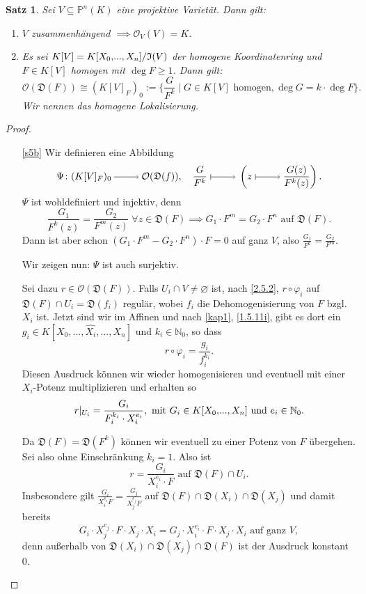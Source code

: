 \documentclass[a4paper,12pt]{scrbook}
\theoremstyle{keinenummern} %
\theoremstyle{mitnummern}
\newtheorem{satz}{Satz}
\theoremstyle{unserbeweis}
\newtheorem{proof}{Beweis}
\def\I{\mathfrak{I}}
\def\O{\mathcal{O}}
\def\P{\mathbb{P}}
\newcommand{\D}{\mathfrak{D}}
\newcommand{\leer}{\ensuremath{\varnothing}}
\newcommand{\restrict}[1]{|_{#1}}
\renewcommand{\dotsc}{\ensuremath{\!...}}
\newcommand{\set}[1]{\ensuremath{\mathbb{#1}}}
\newcommand{\N}{\set{N}}
\newcommand{\ra}{\raisebox{-1pt}{\tikz{\draw[thin,shorten >=3pt, ->] (0,0) node{\hspace*{-2pt}} -- node{} (1,0);}}\penalty1000\relax}
\renewcommand{\mapsto}{\raisebox{-1pt}{\tikz{\draw[thin,shorten >=3pt, |->] (0,0) node{\hspace*{0pt}} -- node{} (1,0);}}\penalty1000\relax}
\newcommand{\dach}{\widehat}
\newcommand{\Quotient}[2]{
  \mathchoice
  { %
    \raisebox{0.7ex}{\ensuremath{#1}}
    \ensuremath{\mkern-3mu}\big/\ensuremath{\mkern-3mu}
    \raisebox{-0.6ex}{\ensuremath{#2}}
  }
  { %
    #1/#2
  }
  { %
    #1/#2
  }
  { %
    #1/#2
  }
}
\newcommand{\ppolyx}[1][n]{\ensuremath%
  [X_{0},\dotsc,X_{#1}]}
\begin{document}
\begin{satz}\label{satz5}
Sei $V\subseteq\P^{n}(K)$ eine projektive Varietät. Dann gilt:
\begin{enumerate}
\item{} $V$ zusammenhängend $\implies\O_{V}(V)=K$.
\item{} Es sei $K[V]=\Quotient{K\ppolyx}{\I(V)}$ der homogene Koordinatenring und $F\in K[V]$ homogen mit $\deg F\geq 1$. Dann gilt:
\[\O(\D(F))\cong(K[V]_{F})_{0}:=\{\frac{G}{F^{k}}\mid G\in K[V]\text{ homogen}, \deg G = k\cdot\deg F\}.\]
Wir nennen das \emph{homogene Lokalisierung}.
\end{enumerate}\end{satz}
\begin{proof}\begin{enumerate}
\item[\ref{s5b}] Wir definieren eine Abbildung
\[\Psi\colon(K[V]_{F})_{0}\ra\O(\D(f)),\quad\frac{G}{F^{k}}\mapsto\left(z\mapsto\frac{G(z)}{F^{k}(z)}\right).\]
$\Psi$ ist wohldefiniert und injektiv, denn
\[\frac{G_{1}}{F^{k}(z)}=\frac{G_{2}}{F^{m}(z)}\;\forall z\in\D(F)\implies G_{1}\cdot F^{m}=G_{2}\cdot F^{n}\text{ auf }\D(F).\]
Dann ist aber schon $(G_{1}\cdot F^{m}-G_{2}\cdot F^{n})\cdot F=0$ auf ganz $V$, also $\frac{G_{1}}{F^{k}}=\frac{G_{2}}{F^{m}}$.

Wir zeigen nun: $\Psi$ ist auch surjektiv.

Sei dazu $r\in\O(\D(F))$. Falls $U_{i}\cap V\neq\leer$ ist, nach \cref{2.5.2}, $r\circ\varphi_{i}$ auf $\D(F)\cap U_{i}=\D(f_{i})$ regulär, wobei $f_{i}$ die Dehomogenisierung von $F$ bzgl. $X_{i}$ ist. Jetzt sind wir im Affinen und nach \cref{kap1}, \cref{1.5.11i}, gibt es dort ein $g_{i}\in K[X_{0},\dotsc,\dach{X_{i}},\dotsc,X_{n}]$ und $k_{i}\in\N_{0}$, so dass
\[r\circ\varphi_{i}=\frac{g_{i}}{f_{i}^{k_{i}}}.\]
Diesen Ausdruck können wir wieder homogenisieren und eventuell mit einer $X_{i}$-Potenz multiplizieren und erhalten so
\[r\restrict{U_{i}}=\frac{G_{i}}{F_{i}^{k_{i}}\cdot X_{i}^{e_{i}}},\text{ mit }G_{i}\in K\ppolyx\text{ und }e_{i}\in\N_{0}.\]

Da $\D(F)=\D(F^{k})$ können wir eventuell zu einer Potenz von $F$ übergehen. Sei also ohne Einschränkung $k_{i}=1$. Also ist
\[r=\frac{G_{i}}{X_{i}^{e_{i}}\cdot F}\text{ auf }\D(F)\cap U_{i}.\]
Insbesondere gilt $\frac{G_{i}}{X_{i}^{e_{i}}F}=\frac{G_{j}}{X_{j}^{e_{j}}F}$ auf $\D(F)\cap\D(X_{i})\cap\D(X_{j})$ und damit bereits
\begin{equation}\label{s5s}G_{i}\cdot X_{j}^{e_{j}}\cdot F\cdot X_{j}\cdot X_{i}=G_{j}\cdot X_{i}^{e_{i}}\cdot F\cdot X_{j}\cdot X_{i}\text{ auf ganz }V,\tag{$*$}\end{equation}
denn außerhalb von $\D(X_{i})\cap\D(X_{j})\cap\D(F)$ ist der Ausdruck konstant $0$.


\end{enumerate}
\end{proof}
\end{document}
